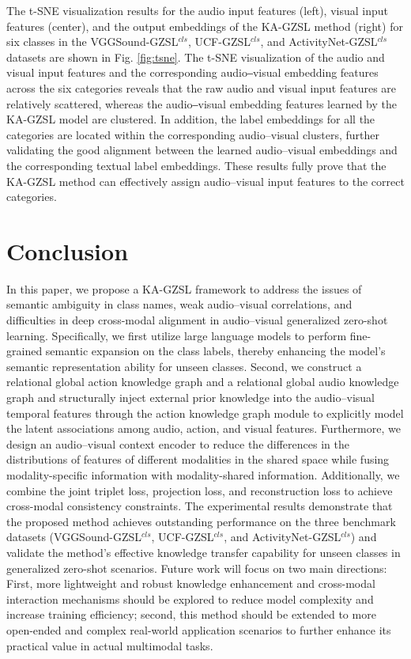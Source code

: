 \documentclass[lettersize,journal]{IEEEtran}
\begin{document}
The t-SNE visualization results for the audio input features (left), visual input features (center), and the output embeddings of the KA-GZSL method (right) for six classes in the VGGSound-GZSL$^{\textit{cls}}$, UCF-GZSL$^{\textit{cls}}$, and ActivityNet-GZSL$^{\textit{cls}}$ datasets are shown in Fig. \ref{fig:tsne}. The t-SNE visualization of the audio and visual input features and the corresponding audio‒visual embedding features across the six categories reveals that the raw audio and visual input features are relatively scattered, whereas the audio‒visual embedding features learned by the KA-GZSL model are clustered. In addition, the label embeddings for all the categories are located within the corresponding audio–visual clusters, further validating the good alignment between the learned audio–visual embeddings and the corresponding textual label embeddings. These results fully prove that the KA-GZSL method can effectively assign audio–visual input features to the correct categories.


\section{Conclusion}
In this paper, we propose a KA-GZSL framework to address the issues of semantic ambiguity in class names, weak audio–visual correlations, and difficulties in deep cross-modal alignment in audio–visual generalized zero-shot learning. Specifically, we first utilize large language models to perform fine-grained semantic expansion on the class labels, thereby enhancing the model’s semantic representation ability for unseen classes. Second, we construct a relational global action knowledge graph and a relational global audio knowledge graph and structurally inject external prior knowledge into the audio–visual temporal features through the action knowledge graph module to explicitly model the latent associations among audio, action, and visual features. Furthermore, we design an audio–visual context encoder to reduce the differences in the distributions of features of different modalities in the shared space while fusing modality-specific information with modality-shared information. Additionally, we combine the joint triplet loss, projection loss, and reconstruction loss to achieve cross-modal consistency constraints. The experimental results demonstrate that the proposed method achieves outstanding performance on the three benchmark datasets (VGGSound-GZSL$^{\textit{cls}}$, UCF-GZSL$^{\textit{cls}}$, and ActivityNet-GZSL$^{\textit{cls}}$) and validate the method's effective knowledge transfer capability for unseen classes in generalized zero-shot scenarios. Future work will focus on two main directions: First, more lightweight and robust knowledge enhancement and cross-modal interaction mechanisms should be explored to reduce model complexity and increase training efficiency; second, this method should be extended to more open-ended and complex real-world application scenarios to further enhance its practical value in actual multimodal tasks.
\end{document}
